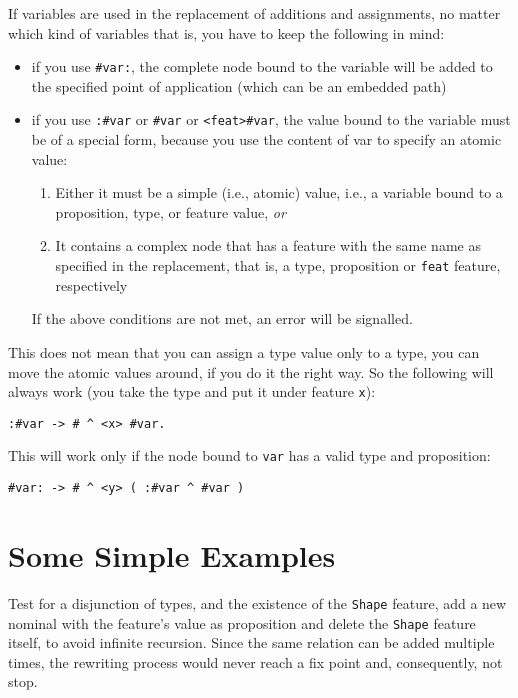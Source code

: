 \documentclass[11pt,a4paper]{report}
\newcommand{\cd}[1]{\texttt{#1}}
\begin{document}
If variables are used in the replacement of additions and assignments, no
matter which kind of variables that is, you have to keep the following in mind:

\begin{itemize}
\item if you use \texttt{\#var:}, the complete node bound to the variable will
  be added to the specified point of application (which can be an embedded
  path)
\item if you use \texttt{:\#var} or \texttt{\#var} or \texttt{<feat>\#var}, the
  value bound to the variable must be of a special form, because you use the
  content of var to specify an atomic value:
  \begin{enumerate}
  \item Either it must be a simple (i.e., atomic) value, i.e., a variable bound
    to a proposition, type, or feature value, \emph{or}
  \item It contains a complex node that has a feature with the same name as
    specified in the replacement, that is, a type, proposition or \texttt{feat}
    feature, respectively
  \end{enumerate}
  If the above conditions are not met, an error will be signalled.
\end{itemize}

This does not mean that you can assign a type value only to a type, you can
move the atomic values around, if you do it the right way.  So the following
will always work (you take the type and put it under feature \texttt{x}):
\begin{verbatim}
:#var -> # ^ <x> #var.
\end{verbatim}

This will work only if the node bound to \texttt{var} has a valid type and
proposition:
\begin{verbatim}
#var: -> # ^ <y> ( :#var ^ #var )
\end{verbatim}

\section{Some Simple Examples}

Test for a disjunction of types, and the existence of the \cd{Shape} feature,
add a new nominal with the feature's value as proposition and delete the
\cd{Shape} feature itself, to avoid infinite recursion. Since the same
relation can be added multiple times, the rewriting process would never reach
a fix point and, consequently, not stop.
\end{document}
